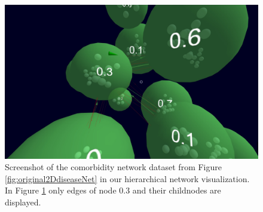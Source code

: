 \begin{figure}[h]
    \centering
    \includegraphics[width=1\textwidth]{graphics/conceptScreenshot.jpg}
    \caption[Screenshot of the comorbidity network dataset.]{Screenshot of the comorbidity network dataset from Figure \ref{fig:original2DdiseaseNet} in our hierarchical network visualization. In Figure \ref{fig:conceptSketch} only edges of node 0.3 and their childnodes are displayed.} %
    \label{fig:conceptSketch} 
\end{figure}